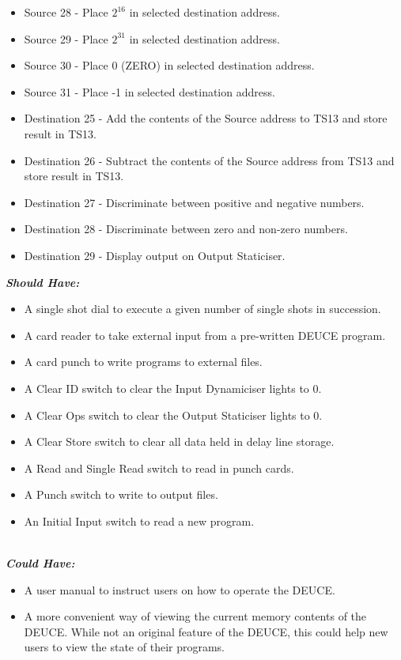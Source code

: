 \documentclass{l4proj}
\begin{document}
\begin{itemize}
\begin{itemize}
		\item Source 28 - Place $ 2^{16} $ in selected destination address.
		\item Source 29 - Place $ 2^{31} $ in selected destination address.
		\item Source 30 - Place 0 (ZERO) in selected destination address.
		\item Source 31 - Place -1 in selected destination address.
		\item Destination 25 - Add the contents of the Source address to TS13 and store result in TS13.
		\item Destination 26 - Subtract the contents of the Source address from TS13 and store result in TS13.
		\item Destination 27 - Discriminate between positive and negative numbers.
		\item Destination 28 - Discriminate between zero and non-zero numbers.
		\item Destination 29 - Display output on Output Staticiser.
		
	\end{itemize}
\end{itemize}

\textbf{\textit{Should Have:}}
\begin{itemize}
	\item A single shot dial to execute a given number of single shots in succession.
	\item A card reader to take external input from a pre-written DEUCE program.
	\item A card punch to write programs to external files.
	\item A Clear ID switch to clear the Input Dynamiciser lights to 0.
	\item A Clear Ops switch to clear the Output Staticiser lights to 0.
	\item A Clear Store switch to clear all data held in delay line storage.
	\item A Read and Single Read switch to read in punch cards.
	\item A Punch switch to write to output files.
	\item An Initial Input switch to read a new program.
	\\
	\\
	
\end{itemize}

\textbf{\textit{Could Have:}}
\begin{itemize}
	\item A user manual to instruct users on how to operate the DEUCE.
	\item A more convenient way of viewing the current memory contents of the DEUCE. While not an original feature of the DEUCE, this could help new users to view the state of their programs.
	
\end{itemize}
\end{document}
